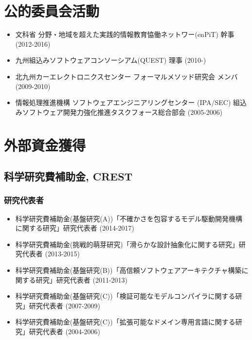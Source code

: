 \documentclass{jarticle}
\begin{document}
\section{公的委員会活動}

\begin{itemize}
\item 文科省 分野・地域を超えた実践的情報教育恊働ネットワー(enPiT) 幹事 (2012-2016)

\item 九州組込みソフトウェアコンソーシアム(QUEST) 理事 (2010-)

\item 北九州カーエレクトロニクスセンター フォーマルメソッド研究会 メンバ (2009-2010)

\item 情報処理推進機構 ソフトウェアエンジニアリングセンター (IPA/SEC) 組込みソフトウェア開発力強化推進タスクフォース総合部会 (2005-2006)

\end{itemize}


\section{外部資金獲得}

\subsection{科学研究費補助金, CREST}

\subsubsection{研究代表者}

\begin{itemize}
\item 科学研究費補助金(基盤研究(A))「不確かさを包容するモデル駆動開発機構に関する研究」研究代表者 (2014-2017)

\item 科学研究費補助金(挑戦的萌芽研究)「滑らかな設計抽象化に関する研究」研究代表者 (2013-2015)

\item 科学研究費補助金(基盤研究(B))「高信頼ソフトウェアアーキテクチャ構築に関する研究」研究代表者 (2011-2013)

\item 科学研究費補助金(基盤研究(C))「検証可能なモデルコンパイラに関する研究」研究代表者 (2007-2009)

\item 科学研究費補助金(基盤研究(C))「拡張可能なドメイン専用言語に関する研究」研究代表者 (2004-2006)
\end{itemize}
\end{document}
